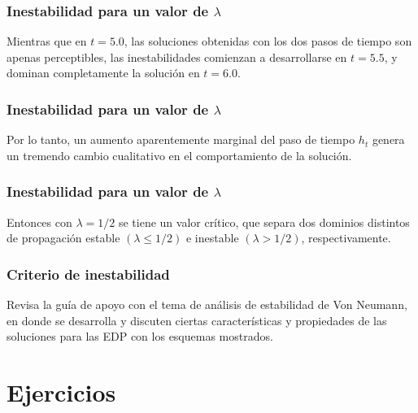 \begin{frame}
\frametitle{Inestabilidad para un valor de $\lambda$}
Mientras que en $t = 5.0$, las soluciones obtenidas con los dos pasos de tiempo son apenas perceptibles, las inestabilidades comienzan a desarrollarse en $t = 5.5$, y dominan completamente la solución en $t = 6.0$.
\end{frame}
\begin{frame}
\frametitle{Inestabilidad para un valor de $\lambda$}
Por lo tanto, un aumento aparentemente marginal del paso de tiempo $h_{t}$ genera un tremendo cambio cualitativo en el comportamiento de la solución.
\end{frame}
\begin{frame}
\frametitle{Inestabilidad para un valor de $\lambda$}
Entonces con $\lambda = 1/2$ se tiene un valor crítico, que separa dos dominios distintos de propagación estable $(\lambda \leq 1/2)$ e inestable $(\lambda > 1/2)$, respectivamente.
\end{frame}
\begin{frame}
\frametitle{Criterio de inestabilidad}
Revisa la guía de apoyo con el tema de análisis de estabilidad de Von Neumann, en donde se desarrolla y discuten ciertas características y propiedades de las soluciones para las EDP con los esquemas mostrados.
\end{frame}
\section{Ejercicios}
